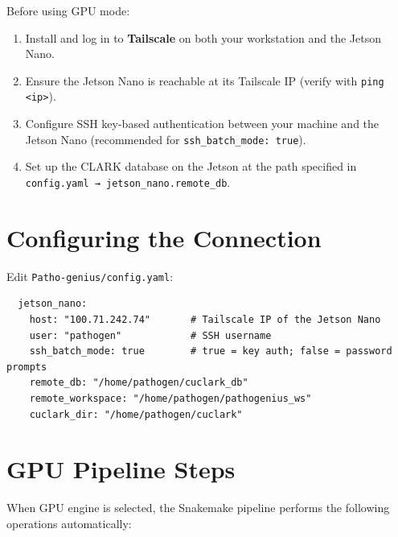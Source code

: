 \documentclass[12pt,a4paper]{report}
\begin{document}
Before using GPU mode:

\begin{enumerate}[leftmargin=1.5em]
  \item Install and log in to \textbf{Tailscale} on both your workstation and the Jetson Nano.
  \item Ensure the Jetson Nano is reachable at its Tailscale IP (verify with \texttt{ping <ip>}).
  \item Configure SSH key-based authentication between your machine and the Jetson Nano (recommended for \texttt{ssh\_batch\_mode: true}).
  \item Set up the CLARK database on the Jetson at the path specified in \texttt{config.yaml → jetson\_nano.remote\_db}.
\end{enumerate}

\section{Configuring the Connection}

Edit \texttt{Patho-genius/config.yaml}:

\begin{verbatim}
  jetson_nano:
    host: "100.71.242.74"       # Tailscale IP of the Jetson Nano
    user: "pathogen"            # SSH username
    ssh_batch_mode: true        # true = key auth; false = password prompts
    remote_db: "/home/pathogen/cuclark_db"
    remote_workspace: "/home/pathogen/pathogenius_ws"
    cuclark_dir: "/home/pathogen/cuclark"
\end{verbatim}

\section{GPU Pipeline Steps}

When GPU engine is selected, the Snakemake pipeline performs the following operations automatically:
\end{document}
